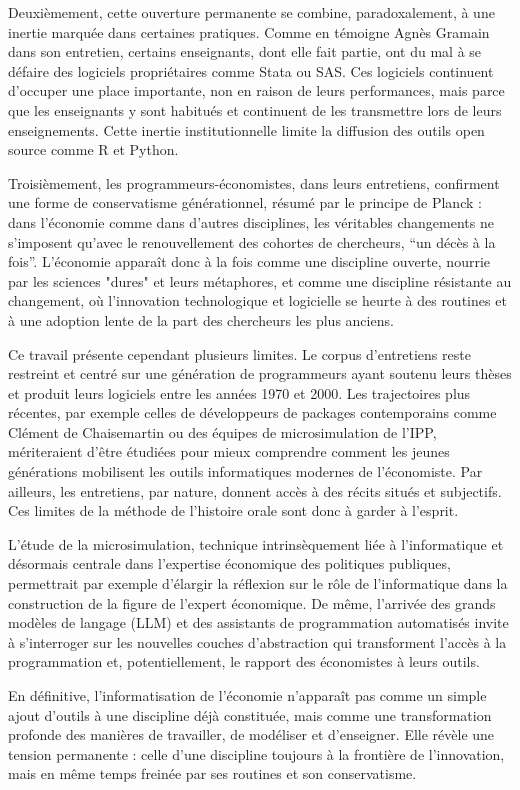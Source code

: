 Deuxièmement, cette ouverture permanente se combine, paradoxalement, à une inertie marquée dans certaines pratiques. Comme en témoigne Agnès Gramain dans son entretien, certains enseignants, dont elle fait partie, ont du mal à se défaire des logiciels propriétaires comme Stata ou SAS. Ces logiciels continuent d’occuper une place importante, non en raison de leurs performances, mais parce que les enseignants y sont habitués et continuent de les transmettre lors de leurs enseignements. Cette inertie institutionnelle limite la diffusion des outils open source comme R et Python.

Troisièmement, les programmeurs-économistes, dans leurs entretiens, confirment une forme de conservatisme générationnel, résumé par le principe de Planck : dans l’économie comme dans d’autres disciplines, les véritables changements ne s’imposent qu’avec le renouvellement des cohortes de chercheurs, “un décès à la fois”. L’économie apparaît donc à la fois comme une discipline ouverte, nourrie par les sciences "dures" et leurs métaphores, et comme une discipline résistante au changement, où l’innovation technologique et logicielle se heurte à des routines et à une adoption lente de la part des chercheurs les plus anciens.

Ce travail présente cependant plusieurs limites. Le corpus d’entretiens reste restreint et centré sur une génération de programmeurs ayant soutenu leurs thèses et produit leurs logiciels entre les années 1970 et 2000. Les trajectoires plus récentes, par exemple celles de développeurs de packages contemporains comme Clément de Chaisemartin ou des équipes de microsimulation de l’IPP, mériteraient d’être étudiées pour mieux comprendre comment les jeunes générations mobilisent les outils informatiques modernes de l'économiste. Par ailleurs, les entretiens, par nature, donnent accès à des récits situés et subjectifs. Ces limites de la méthode de l'histoire orale sont donc à garder à l'esprit.

L’étude de la microsimulation, technique intrinsèquement liée à l’informatique et désormais centrale dans l’expertise économique des politiques publiques, permettrait par exemple d’élargir la réflexion sur le rôle de l’informatique dans la construction de la figure de l'expert économique. De même, l’arrivée des grands modèles de langage (LLM) et des assistants de programmation automatisés invite à s’interroger sur les nouvelles couches d’abstraction qui transforment l’accès à la programmation et, potentiellement, le rapport des économistes à leurs outils.

En définitive, l’informatisation de l’économie n’apparaît pas comme un simple ajout d’outils à une discipline déjà constituée, mais comme une transformation profonde des manières de travailler, de modéliser et d’enseigner. Elle révèle une tension permanente : celle d’une discipline toujours à la frontière de l’innovation, mais en même temps freinée par ses routines et son conservatisme.
